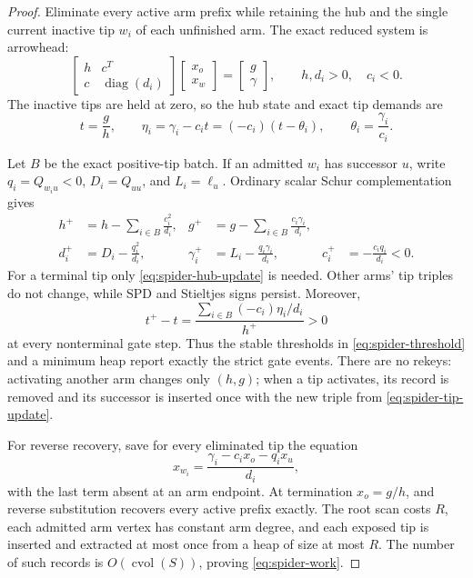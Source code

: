 \begin{proof}
Eliminate every active arm prefix while retaining the hub and the single
current inactive tip $w_i$ of each unfinished arm.  The exact reduced system
is arrowhead:
\begin{equation}
 \begin{bmatrix}h&c^T\\c&\operatorname{diag}(d_i)\end{bmatrix}
 \begin{bmatrix}x_o\\x_w\end{bmatrix}
 =\begin{bmatrix}g\\\gamma\end{bmatrix},
 \qquad h,d_i>0,\quad c_i<0.
 \label{eq:spider-arrowhead}
\end{equation}
The inactive tips are held at zero, so the hub state and exact tip demands are
\begin{equation}
 t=\frac gh,
 \qquad
 \eta_i=\gamma_i-c_it=(-c_i)(t-\theta_i),
 \qquad
 \theta_i=\frac{\gamma_i}{c_i}.
 \label{eq:spider-threshold}
\end{equation}

Let $B$ be the exact positive-tip batch.  If an admitted $w_i$ has successor
$u$, write $q_i=Q_{w_i u}<0$, $D_i=Q_{uu}$, and $L_i=\ell_u$.  Ordinary
scalar Schur complementation gives
\begin{align}
 h^+&=h-\sum_{i\in B}\frac{c_i^2}{d_i},
 &g^+&=g-\sum_{i\in B}\frac{c_i\gamma_i}{d_i},
 \label{eq:spider-hub-update}\\
 d_i^+&=D_i-\frac{q_i^2}{d_i},
 &\gamma_i^+&=L_i-\frac{q_i\gamma_i}{d_i},
 &c_i^+&=-\frac{c_iq_i}{d_i}<0.
 \label{eq:spider-tip-update}
\end{align}
For a terminal tip only \cref{eq:spider-hub-update} is needed.  Other arms'
tip triples do not change, while SPD and Stieltjes signs persist.  Moreover,
\begin{equation}
 t^+-t
 =\frac{\sum_{i\in B}(-c_i)\eta_i/d_i}{h^+}>0
 \label{eq:spider-strict-monotonicity}
\end{equation}
at every nonterminal gate step.  Thus the stable thresholds in
\cref{eq:spider-threshold} and a minimum heap report exactly the strict gate
events.  There are no rekeys: activating another arm changes only $(h,g)$;
when a tip activates, its record is removed and its successor is inserted
once with the new triple from \cref{eq:spider-tip-update}.

For reverse recovery, save for every eliminated tip the equation
\begin{equation}
 x_{w_i}=\frac{\gamma_i-c_ix_o-q_ix_u}{d_i},
 \label{eq:spider-recovery}
\end{equation}
with the last term absent at an arm endpoint.  At termination $x_o=g/h$, and
reverse substitution recovers every active prefix exactly.  The root scan
costs $R$, each admitted arm vertex has constant arm degree, and each exposed
tip is inserted and extracted at most once from a heap of size at most $R$.
The number of such records is $O(\operatorname{cvol}(S))$, proving
\cref{eq:spider-work}.
\end{proof}


